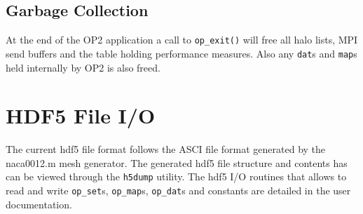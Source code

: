 \documentclass[11pt]{article}
\begin{document}

\subsection{Garbage Collection}\label{subsec/cleanup}
At the end of the OP2 application a call to \texttt{op\_exit()} will free all halo lists, MPI send buffers and the table
holding performance measures. Also any \texttt{dat}s and \texttt{map}s held internally by OP2 is also freed.

\section{HDF5 File I/O}\label{sec/hdf5}
The current hdf5 file format follows the ASCI file format generated by
the naca0012.m mesh generator. The generated hdf5 file structure and contents
has can be viewed through the \texttt{h5dump} utility.  The hdf5 I/O routines that
allows to read and write \texttt{op\_set}s, \texttt{op\_map}s, \texttt{op\_dat}s
and constants are detailed in the user documentation.




\end{document}
